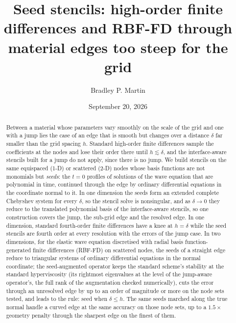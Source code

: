 \documentclass[11pt]{amsart}
\title[Seed stencils for sub-grid material edges]{Seed stencils: high-order
finite differences and RBF-FD through material edges too steep for the grid}
\author{Bradley P. Martin}
\date{September 20, 2026}
\theoremstyle{definition}
\theoremstyle{remark}
\begin{document}
\begin{abstract}
Between a material whose parameters vary smoothly on the scale of the grid
and one with a jump lies the case of an edge that is smooth but changes over
a distance $\delta$ far smaller than the grid spacing $h$. Standard
high-order finite differences sample the coefficients at the nodes and lose
their order there until $h \lesssim \delta$, and the interface-aware
stencils built for a jump do not apply, since there is no jump. We build
stencils on the same equispaced (1-D) or scattered (2-D) nodes whose basis
functions are not monomials but \emph{seeds}: the $t = 0$ profiles of
solutions of the wave equation that are polynomial in time, continued
through the edge by ordinary differential equations in the coordinate normal
to it. In one dimension the seeds form an extended complete Chebyshev system
for every $\delta$, so the stencil solve is nonsingular, and as
$\delta \to 0$ they reduce to the translated polynomial basis of the
interface-aware stencils, so one construction covers the jump, the
sub-grid edge and the resolved edge. In one dimension, standard fourth-order finite differences have a
knee at $h = \delta$ while the seed stencils are fourth order at every
resolution with the errors of the jump case. In two dimensions, for the
elastic wave equation discretised with radial basis function-generated
finite differences (RBF-FD) on scattered nodes, the seeds of a straight
edge reduce to triangular systems of ordinary differential equations in the
normal coordinate; the seed-augmented operator keeps the standard scheme's stability at the
standard hyperviscosity (its rightmost eigenvalues at the level of the
jump-aware operator's, the full rank of the augmentation checked
numerically), cuts the error through an unresolved edge by up to an order
of magnitude or more on the node sets tested, and leads to the rule: seed
when $\delta \le h$. The same seeds marched along the true normal handle a
curved edge at the same accuracy on those node sets, up to a $1.5\times$
geometry penalty through the sharpest edge on the finest of them.
\end{abstract}
\end{document}
